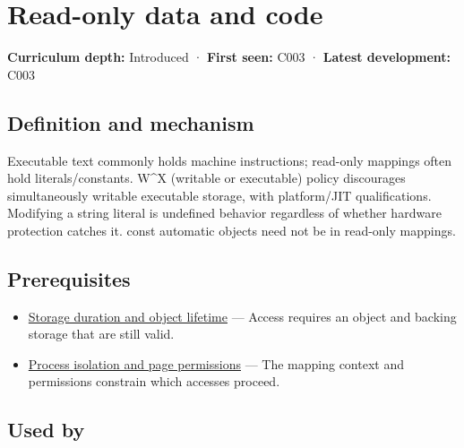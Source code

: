 \hypertarget{appendix-5f9e5e2f0a5e}{}\label{referencestart:appendix-5f9e5e2f0a5e}
\section{Read-only data and code}\label{appendix-5f9e5e2f0a5e-read-only-data-and-code}

\hypertarget{appendix-5f9e5e2f0a5e-read-only-data-and-code}{}

\textbf{Curriculum depth:} Introduced · \textbf{First seen:} C003 · \textbf{Latest development:} C003

\begin{allmightroledefinition}

\subsection{Definition and mechanism}\label{appendix-5f9e5e2f0a5e-definition-and-mechanism}

\hypertarget{appendix-5f9e5e2f0a5e-definition-and-mechanism}{}

Executable text commonly holds machine instructions; read-only mappings often hold literals/constants. W\^{}X (writable or executable) policy discourages simultaneously writable executable storage, with platform/JIT qualifications. Modifying a string literal is undefined behavior regardless of whether hardware protection catches it. const automatic objects need not be in read-only mappings.

\end{allmightroledefinition}

\subsection{Prerequisites}\label{appendix-5f9e5e2f0a5e-prerequisites}

\hypertarget{appendix-5f9e5e2f0a5e-prerequisites}{}

\begin{itemize}
\tightlist
\item
  \hyperref[appendix-0b104bcba06b]{Storage duration and object lifetime} --- Access requires an object and backing storage that are still valid.
\item
  \hyperref[appendix-c2a9ad1e2b49]{Process isolation and page permissions} --- The mapping context and permissions constrain which accesses proceed.
\end{itemize}

\subsection{Used by}\label{appendix-5f9e5e2f0a5e-used-by}


